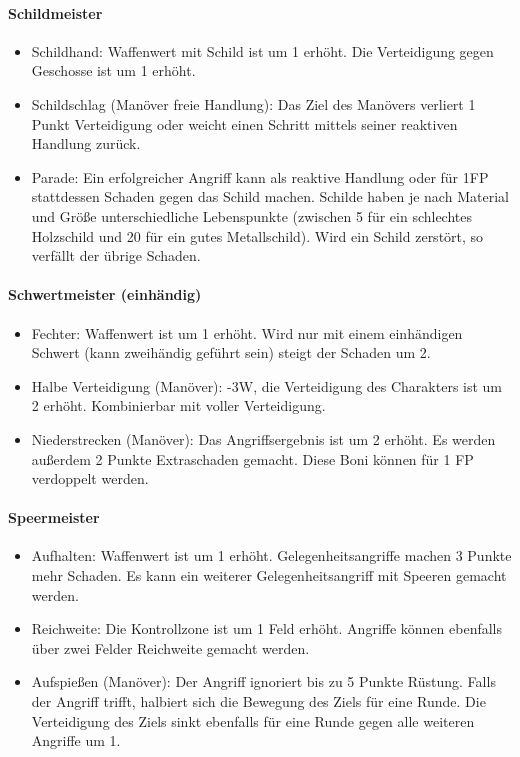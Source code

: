 \documentclass{article}
\begin{document}
\paragraph{Schildmeister}

\begin{itemize}
\item Schildhand: Waffenwert mit Schild ist um 1 erhöht. Die Verteidigung gegen Geschosse ist um 1 erhöht.
\item Schildschlag (Manöver freie Handlung): Das Ziel des Manövers verliert 1 Punkt Verteidigung oder weicht einen Schritt mittels seiner reaktiven Handlung zurück.
\item Parade: Ein erfolgreicher Angriff kann als reaktive Handlung oder für 1FP stattdessen Schaden gegen das Schild machen. Schilde haben je nach Material und Größe unterschiedliche Lebenspunkte (zwischen 5 für ein schlechtes Holzschild und 20 für ein gutes Metallschild). Wird ein Schild zerstört, so verfällt der übrige Schaden.
\end{itemize}

\paragraph{Schwertmeister (einhändig)}

\begin{itemize}
\item Fechter: Waffenwert ist um 1 erhöht. Wird nur mit einem einhändigen Schwert (kann zweihändig geführt sein) steigt der Schaden um 2.
\item Halbe Verteidigung (Manöver): -3W, die Verteidigung des Charakters ist um 2 erhöht. Kombinierbar mit voller Verteidigung.
\item Niederstrecken (Manöver): Das Angriffsergebnis ist um 2 erhöht. Es werden außerdem 2 Punkte Extraschaden gemacht. Diese Boni können für 1 FP verdoppelt werden.
\end{itemize}

\paragraph{Speermeister}

\begin{itemize}
\item Aufhalten: Waffenwert ist um 1 erhöht. Gelegenheitsangriffe machen 3 Punkte mehr Schaden. Es kann ein weiterer Gelegenheitsangriff mit Speeren gemacht werden.
\item Reichweite: Die Kontrollzone ist um 1 Feld erhöht. Angriffe können ebenfalls über zwei Felder Reichweite gemacht werden.
\item Aufspießen (Manöver): Der Angriff ignoriert bis zu 5 Punkte Rüstung. Falls der Angriff trifft, halbiert sich die Bewegung des Ziels für eine Runde. Die Verteidigung des Ziels sinkt ebenfalls für eine Runde gegen alle weiteren Angriffe um 1.
\end{itemize}
\end{document}
